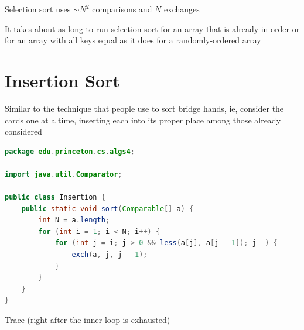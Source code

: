 \documentclass[8pt,a4paper,compress]{beamer}
\begin{document}
\begin{frame}[fragile]
\pause

Selection sort uses $\sim N^2$ comparisons and $N$ exchanges

\pause
\bigskip

It takes about as long to run selection sort for an array that is already in order or for an array with all keys equal as it does for a randomly-ordered array
\end{frame}

\section{Insertion Sort}
\begin{frame}[fragile]
\pause

Similar to the technique that people use to sort bridge hands, ie, consider the cards one at a time, inserting each into its proper place among those already considered

\pause
\bigskip

\begin{lstlisting}[language=Java]
package edu.princeton.cs.algs4;

import java.util.Comparator;

public class Insertion {
    public static void sort(Comparable[] a) {
        int N = a.length;
        for (int i = 1; i < N; i++) {
            for (int j = i; j > 0 && less(a[j], a[j - 1]); j--) {
                exch(a, j, j - 1);
            }
        }
    }
}
\end{lstlisting}
\end{frame}

\begin{frame}[fragile]
\pause

Trace (right after the inner loop is exhausted)
\begin{center}
\end{center}
\end{frame}
\end{document}
